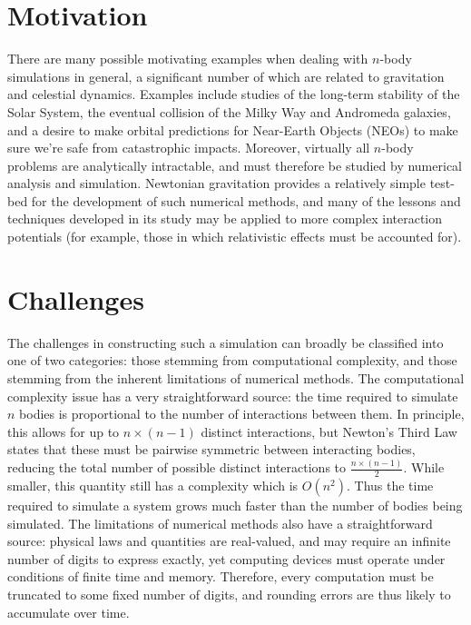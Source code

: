 \documentclass[10pt,twocolumn]{article}
\begin{document}
	\section{Motivation}
	\label{sec:motivation}
	There are many possible motivating examples when dealing with $n$-body simulations in general, a significant number
	of which are related to gravitation and celestial dynamics. Examples include studies of the long-term stability of the Solar System,
	the eventual collision of the Milky Way and Andromeda galaxies, and a desire to make orbital predictions for Near-Earth Objects (NEOs)
	to make sure we're safe from catastrophic impacts. Moreover, virtually all $n$-body problems are analytically intractable, and must
	therefore be studied by numerical analysis and simulation. Newtonian gravitation provides a relatively simple test-bed for the development
	of such numerical methods, and many of the lessons and techniques developed in its study may be applied to more complex interaction
	potentials (for example, those in which relativistic effects must be accounted for).
	
	
	\section{Challenges}
	\label{sec:challenges}
	The challenges in constructing such a simulation can broadly be classified into one of two categories: those stemming from
	computational complexity, and those stemming from the inherent limitations of numerical methods. The computational complexity issue has a very straightforward source: the time required to simulate $n$ bodies is proportional to
	the number of interactions between them. In principle, this allows for up to $n \times (n-1)$ distinct interactions, but Newton's
	Third Law states that these must be pairwise symmetric between interacting bodies, reducing the total number of possible distinct
	interactions to $\frac{n \times (n-1)}{2}$. While smaller, this quantity still has a complexity which is $O(n^{2})$. Thus the time required
	to simulate a system grows much faster than the number of bodies being simulated.
	The limitations of numerical methods also have a straightforward source: physical laws and quantities are real-valued,
	and may require an infinite number of digits to express exactly, yet computing devices must operate under conditions of finite
	time and memory. Therefore, every computation must be truncated to some fixed number of digits, and rounding errors are thus likely to
	accumulate over time.
	
\end{document}

